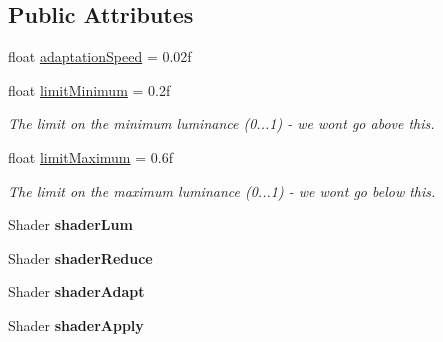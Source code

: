 \subsection*{Public Attributes}
\begin{DoxyCompactItemize}
\item 
float \hyperlink{class_unity_standard_assets_1_1_image_effects_1_1_contrast_stretch_ab81f2962fed7bf78dc6d065d815fc195}{adaptation\+Speed} = 0.\+02f
\item 
float \hyperlink{class_unity_standard_assets_1_1_image_effects_1_1_contrast_stretch_af7b86c130f65b4b1f36fff63266a9cf6}{limit\+Minimum} = 0.\+2f
\begin{DoxyCompactList}\small\item\em The limit on the minimum luminance (0...1) -\/ we won\textquotesingle{}t go above this. \end{DoxyCompactList}\item 
float \hyperlink{class_unity_standard_assets_1_1_image_effects_1_1_contrast_stretch_a75173bbdb49e664a2d4bc33dfb67be15}{limit\+Maximum} = 0.\+6f\hypertarget{class_unity_standard_assets_1_1_image_effects_1_1_contrast_stretch_a75173bbdb49e664a2d4bc33dfb67be15}{}\label{class_unity_standard_assets_1_1_image_effects_1_1_contrast_stretch_a75173bbdb49e664a2d4bc33dfb67be15}

\begin{DoxyCompactList}\small\item\em The limit on the maximum luminance (0...1) -\/ we won\textquotesingle{}t go below this. \end{DoxyCompactList}\item 
Shader {\bfseries shader\+Lum}\hypertarget{class_unity_standard_assets_1_1_image_effects_1_1_contrast_stretch_a43da5e935fbd2503567535bb4d626e40}{}\label{class_unity_standard_assets_1_1_image_effects_1_1_contrast_stretch_a43da5e935fbd2503567535bb4d626e40}

\item 
Shader {\bfseries shader\+Reduce}\hypertarget{class_unity_standard_assets_1_1_image_effects_1_1_contrast_stretch_a713e2421a92d13f99892df3edac98acd}{}\label{class_unity_standard_assets_1_1_image_effects_1_1_contrast_stretch_a713e2421a92d13f99892df3edac98acd}

\item 
Shader {\bfseries shader\+Adapt}\hypertarget{class_unity_standard_assets_1_1_image_effects_1_1_contrast_stretch_ac01688755bbb7059ba53739dd823d3f7}{}\label{class_unity_standard_assets_1_1_image_effects_1_1_contrast_stretch_ac01688755bbb7059ba53739dd823d3f7}

\item 
Shader {\bfseries shader\+Apply}\hypertarget{class_unity_standard_assets_1_1_image_effects_1_1_contrast_stretch_acd9e4e3bae17bf9471c9cc8350c5e162}{}\label{class_unity_standard_assets_1_1_image_effects_1_1_contrast_stretch_acd9e4e3bae17bf9471c9cc8350c5e162}

\end{DoxyCompactItemize}
